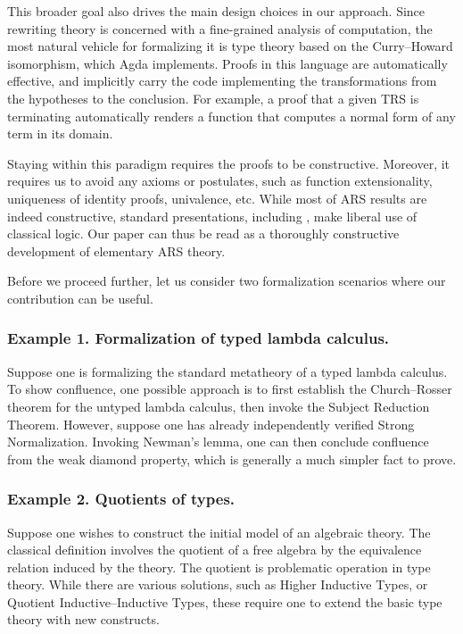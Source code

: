 \documentclass{scrartcl}
\newcommand{\hired}[1]{{\color{red}{#1}}}
\begin{document}
This broader goal also drives the main design choices in our approach.
Since rewriting theory is concerned with a fine-grained analysis of computation,
the most natural vehicle for formalizing it is type theory based on the
Curry--Howard isomorphism, which Agda implements.  Proofs in this language
are automatically effective, and implicitly carry the code implementing the
transformations from the hypotheses to the conclusion.  For example,
a proof that a given TRS is terminating automatically renders a function that
computes a normal form of any term in its domain.

Staying within this paradigm requires the proofs to be constructive.
Moreover, it requires us to avoid any axioms or postulates, such as function
extensionality, uniqueness of identity proofs, univalence, etc.
While most of ARS results are indeed constructive, standard presentations,
 including \hired{[Terese]}, make liberal use of classical logic.
Our paper can thus be read as a thoroughly constructive
development of elementary ARS theory.

Before we proceed further, let us consider two formalization scenarios where
our contribution can be useful.

\subsubsection*{Example 1. Formalization of typed lambda calculus.}

Suppose one is formalizing the standard metatheory of
a typed lambda calculus.  To show confluence, one possible approach is to
first establish the Church--Rosser theorem for the untyped lambda calculus,
then invoke the Subject Reduction Theorem.
However, suppose one has already independently verified Strong Normalization.
Invoking Newman's lemma, one can then conclude confluence from the weak
diamond property, which is generally a much simpler fact to prove.

\subsubsection*{Example 2. Quotients of types.}
Suppose one wishes to construct the initial model of an algebraic theory.
The classical definition involves the quotient of a free algebra by
the equivalence relation induced by the theory.
The quotient is problematic operation in type theory.
While there are various solutions, such as Higher Inductive Types,
or Quotient Inductive--Inductive Types, these require one to extend the
basic type theory with new constructs.
\end{document}
